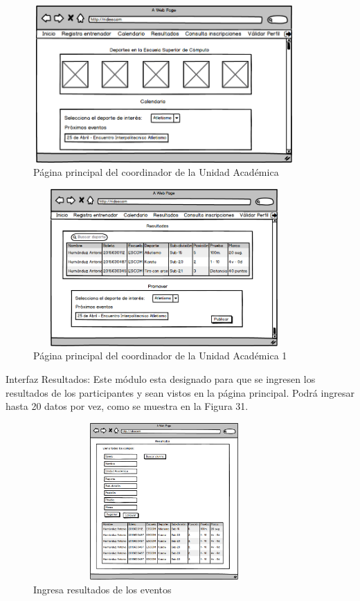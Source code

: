 	\begin{figure}[hbt!]
		\centering
		\includegraphics[width=10cm, height=6cm]{Imagenes/Disenos/p9InicioCoordUA.png}
		\caption{Página principal del coordinador de la Unidad Académica}
	\end{figure}
	
	\pagebreak
	
	\begin{figure}[hbt!]
		\centering
		\includegraphics[width=10cm, height=6cm]{Imagenes/Disenos/p10InicioCoordUA1.png}
		\caption{Página principal del coordinador de la Unidad Académica 1}
	\end{figure}

	\noindent Interfaz Resultados: Este módulo esta designado para que se ingresen los resultados de los participantes y sean vistos en la página principal. Podrá ingresar hasta 20 datos por vez, como se muestra en la Figura 31.
	\begin{figure}[hbt!]
		\centering
		\includegraphics[width=10cm, height=6cm]{Imagenes/Disenos/p11Ingresaresultados.png}
		\caption{Ingresa resultados de los eventos}
	\end{figure}
	
